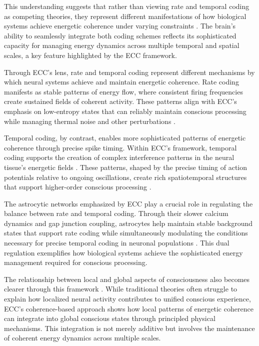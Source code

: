 \begin{refsection}
This understanding suggests that rather than viewing rate and temporal coding as competing theories, they represent different manifestations of how biological systems achieve energetic coherence under varying constraints \cite{fell2011role}. The brain's ability to seamlessly integrate both coding schemes reflects its sophisticated capacity for managing energy dynamics across multiple temporal and spatial scales, a key feature highlighted by the ECC framework.

Through ECC's lens, rate and temporal coding represent different mechanisms by which neural systems achieve and maintain energetic coherence. Rate coding manifests as stable patterns of energy flow, where consistent firing frequencies create sustained fields of coherent activity. These patterns align with ECC's emphasis on low-entropy states that can reliably maintain conscious processing while managing thermal noise and other perturbations \cite{wang2010neurophysiological}.

Temporal coding, by contrast, enables more sophisticated patterns of energetic coherence through precise spike timing. Within ECC's framework, temporal coding supports the creation of complex interference patterns in the neural tissue's energetic fields \cite{adhikari2010cross}. These patterns, shaped by the precise timing of action potentials relative to ongoing oscillations, create rich spatiotemporal structures that support higher-order conscious processing \cite{buzsaki2004neuronal}.

The astrocytic networks emphasized by ECC play a crucial role in regulating the balance between rate and temporal coding. Through their slower calcium dynamics and gap junction coupling, astrocytes help maintain stable background states that support rate coding while simultaneously modulating the conditions necessary for precise temporal coding in neuronal populations \cite{honey2012slow}. This dual regulation exemplifies how biological systems achieve the sophisticated energy management required for conscious processing.

The relationship between local and global aspects of consciousness also becomes clearer through this framework \cite{singer1999neuronal}. While traditional theories often struggle to explain how localized neural activity contributes to unified conscious experience, ECC's coherence-based approach shows how local patterns of energetic coherence can integrate into global conscious states through principled physical mechanisms. This integration is not merely additive but involves the maintenance of coherent energy dynamics across multiple scales.


\end{refsection}
